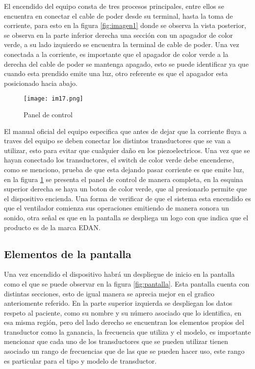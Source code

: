 \documentclass[letterpaper,12pt,oneside]{book}
\begin{document}
El encendido del equipo consta de tres procesos principales, entre ellos se encuentra en conectar el cable de poder desde su terminal, hasta la toma de corriente, para esto en la figura \ref{fig:imagen1} donde se observa la vista posterior, se observa en la parte inferior derecha una sección con un apagador de color verde, a su lado izquierdo se encuentra la terminal de cable de poder. Una vez conectada a la corriente, es importante que el apagador de color verde a la derecha del cable de poder se mantenga apagado, esto se puede identificar ya que cuando esta prendido emite una luz, otro referente es que el apagador esta posicionado hacia abajo.

\vspace{10pt}



\begin{figure}[h!]
    \centering
    \texttt{[image: im17.png]}
    \caption{Panel de control}
    \label{fig:panel}
    
\end{figure}


\vspace{10pt}

El manual oficial del equipo especifica que antes de dejar que la corriente fluya a traves del equipo se deben conectar los distintos transductores que se van a utilizar, esto para evitar que cualquier daño en los piezoelectricos. Una vez que se hayan conectado los transductores, el switch de color verde debe encenderse, como se menciono, prueba de que esta dejando pasar corriente es que emite luz, en la figura \ref{fig:panel} se presenta el panel de control de manera completa, en la esquina superior derecha se haya un boton de color verde, que al presionarlo permite que el dispositivo encienda. Una forma de verificar de que el sistema esta encendido es que el ventilador comienza sus operaciones emitiendo de manera sonora un sonido, otra señal es que en la pantalla se despliega un logo con que indica que el producto es de la marca EDAN.


\subsection{Elementos de la pantalla}

Una vez encendido el dispositivo habrá un despliegue de inicio en la pantalla como el que se puede observar en la figura \ref{fig:pantalla}. Esta pantalla cuenta con distintas secciones, esto de igual manera se aprecia mejor en el grafico anteriomente referido. En la parte superior izquierda se despliegan los datos respeto al paciente, como su nombre y su número asociado que lo identifica, en esa misma región, pero del lado derecho se encuentran los elementos propios del transductor como la ganancia, la frecuencia que utiliza y el modelo, es importante mencionar que cada uno de los transductores que se pueden utilizar tienen asociado un rango de frecuencias que de las que se pueden hacer uso, este rango es particular para el tipo y modelo de transductor. 
\end{document}

